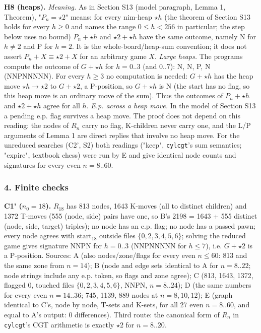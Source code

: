 \textbf{H8 (heaps).} \emph{Meaning.} As in Section S13 (model paragraph, Lemma 1, Theorem), "$P_n=\star2$" means: for every nim-heap $\star h$ (the theorem of Section S13 holds for every $h\ge0$ and names the range $0\le h<256$ in particular; the step below uses no bound) $P_n+\star h$ and $\star2+\star h$ have the same outcome, namely N for $h\ne2$ and P for $h=2$. It is the whole-board/heap-sum convention; it does not assert $P_n+X\equiv\star2+X$ for an arbitrary game $X$. \emph{Large heaps.} The programs compute the outcome of $G+\star h$ for $h=0..3$ (and $0..7$): N, N, P, N (NNPNNNNN). For every $h\ge3$ no computation is needed: $G+\star h$ has the heap move $\star h\to\star2$ to $G+\star2$, a P-position, so $G+\star h$ is N (the start has no flag, so this heap move is an ordinary move of the sum). Thus the outcomes of $P_n+\star h$ and $\star2+\star h$ agree for all $h$. \emph{E.p. across a heap move.} In the model of Section S13 a pending e.p. flag survives a heap move. The proof does not depend on this reading: the nodes of $R_n$ carry no flag, K-children never carry one, and the L/P arguments of Lemma 1 are direct replies that involve no heap move. For the unreduced searches (C2', S2) both readings ("keep", \texttt{cylcgt}'s sum semantics; "expire", textbook chess) were run by E and give identical node counts and signatures for every even $n=8..60$.

\subsubsection*{4. Finite checks}
\textbf{C1' ($n_0=18$).} $R_{18}$ has 813 nodes, 1643 K-moves (all to distinct children) and 1372 T-moves (555 (node, side) pairs have one, so B's 2198 = 1643 + 555 distinct (node, side, target) triples); no node has an e.p. flag; no node has a passed pawn; every node agrees with $\mathrm{start}_{18}$ outside files $\{0,2,3,4,5,6\}$; solving the reduced game gives signature NNPN for $h=0..3$ (NNPNNNNN for $h\le7$), i.e. $G+\star2$ is a P-position. Sources: A (also nodes/zone/flags for every even $n\le60$: 813 and the same zone from $n=14$); B (node and edge sets identical to A for $n=8..22$; node strings include any e.p. token, so flags and zone agree); C (813, 1643, 1372, flagged 0, touched files $\{0,2,3,4,5,6\}$, NNPN, $n=8..24$); D (the same numbers for every even $n=14..36$; 745, 1139, 889 nodes at $n=8,10,12$); E (graph identical to C's, node by node, T-sets and K-sets, for all 27 even $n=8..60$, and equal to A's output: 0 differences). Third route: the canonical form of $R_n$ in \texttt{cylcgt}'s CGT arithmetic is exactly $\star2$ for $n=8..20$.

